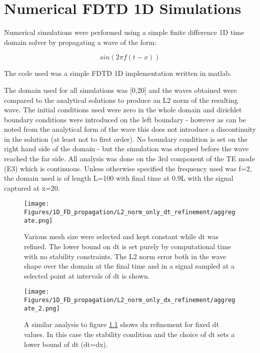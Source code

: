 
\chapter{Numerical FDTD 1D Simulations} %
\label{Chapter5}

Numerical simulations were performed using a simple finite difference 1D time domain solver by propagating a wave of the form:

$$
sin(2 \pi f (t - x))
$$

The code used was a simple FDTD 1D implementation written in matlab.

The domain used for all simulations was [0,20] and the waves obtained were compared to the analytical solutions to produce an L2 norm of the resulting wave. The initial conditions used were zero in the whole domain and dirichlet boundary conditions were introduced on the left boundary - however as can be noted from the analytical form of the wave this does not introduce a discontinuity in the solution (at least not to first order). No boundary condition is set on the right hand side of the domain - but the simulation was stopped before the wave reached the far side.
All analysis was done on the 3rd component of the TE mode (E3) which is continuous.
Unless otherwise specified the frequency used was f=2, the domain used is of length L=100 with final time at 0.9L with the signal captured at x=20.

\begin{figure}
\texttt{[image: Figures/1D\_FD\_propagation/L2\_norm\_only\_dt\_refinement/aggregate.png]}
\caption{Various mesh size were selected and kept constant while dt was refined. The lower bound on dt is set purely by computational time with no stability constraints. The L2 norm error both in the wave shape over the domain at the final time and in a signal sampled at a selected point at intervals of dt is shown.}
\label{dt_refinement}
\end{figure}

\begin{figure}
\texttt{[image: Figures/1D\_FD\_propagation/L2\_norm\_only\_dx\_refinement/aggregate\_2.png]}
\caption{A similar analysis to figure \ref{dt_refinement} shows dx refinement for fixed dt values. In this case the stability condition and the choice of dt sets a lower bound of dt (dt=dx).}
\end{figure}

